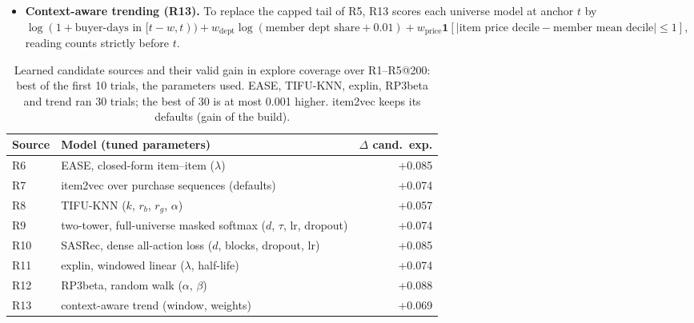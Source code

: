 \documentclass{ieeeaccess}
\begin{document}
\begin{itemize}
\item \textbf{Context-aware trending (R13).} To replace the capped tail of R5, R13 scores each universe model at anchor $t$ by
$\log(1 + \text{buyer-days in } [t-w, t)) + w_{\mathrm{dept}}\log(\text{member dept share} + 0.01) + w_{\mathrm{price}}\mathbf{1}[|\text{item price decile} - \text{member mean decile}| \le 1]$, reading counts strictly before $t$.
\end{itemize}

\begin{table}[t]
\caption{Learned candidate sources and their valid gain in explore coverage over R1--R5@200: best of the first 10 trials, the
parameters used. EASE, TIFU-KNN, explin, RP3beta and trend ran 30 trials; the best of 30 is at most 0.001 higher. item2vec keeps
its defaults (gain of the build).}
\label{tab:sources}
\setlength{\tabcolsep}{3pt}
\centering
\begin{adjustbox}{max width=\columnwidth}
\begin{tabular}{llr}
\toprule
Source & Model (tuned parameters) & $\Delta$ cand.\ exp. \\
\midrule
R6  & EASE, closed-form item--item ($\lambda$)                   & +0.085 \\
R7  & item2vec over purchase sequences (defaults)                & +0.074 \\
R8  & TIFU-KNN ($k$, $r_b$, $r_g$, $\alpha$)                      & +0.057 \\
R9  & two-tower, full-universe masked softmax ($d$, $\tau$, lr, dropout) & +0.074 \\
R10 & SASRec, dense all-action loss ($d$, blocks, dropout, lr)    & +0.085 \\
R11 & explin, windowed linear ($\lambda$, half-life)              & +0.074 \\
R12 & RP3beta, random walk ($\alpha$, $\beta$)                    & +0.088 \\
R13 & context-aware trend (window, weights)                       & +0.069 \\
\bottomrule
\end{tabular}
\end{adjustbox}
\end{table}
\end{document}
